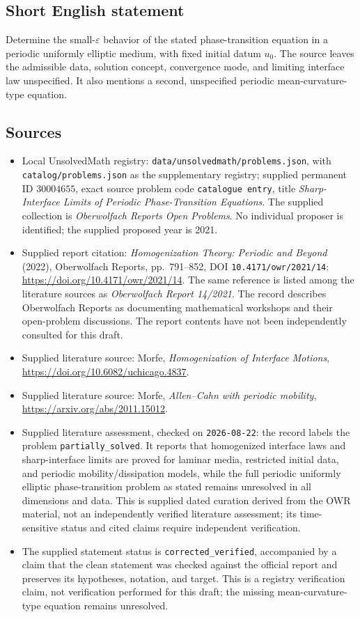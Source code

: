 \documentclass[11pt]{article}
\begin{document}
\subsection{Short English statement}
Determine the small-\(\varepsilon\) behavior of the stated phase-transition equation in a periodic uniformly elliptic medium, with fixed initial datum \(u_0\). The source leaves the admissible data, solution concept, convergence mode, and limiting interface law unspecified. It also mentions a second, unspecified periodic mean-curvature-type equation.
\subsection{Sources}
\begin{itemize}
\item Local UnsolvedMath registry: \texttt{data/unsolvedmath/problems.json}, with \texttt{catalog/problems.json} as the supplementary registry; supplied permanent ID \(30004655\), exact source problem code \texttt{catalogue entry}, title \emph{Sharp-Interface Limits of Periodic Phase-Transition Equations}. The supplied collection is \emph{Oberwolfach Reports Open Problems}. No individual proposer is identified; the supplied proposed year is 2021.
\item Supplied report citation: \emph{Homogenization Theory: Periodic and Beyond} (2022), Oberwolfach Reports, pp.~791--852, DOI \texttt{10.4171/owr/2021/14}: \url{https://doi.org/10.4171/owr/2021/14}. The same reference is listed among the literature sources as \emph{Oberwolfach Report 14/2021}. The record describes Oberwolfach Reports as documenting mathematical workshops and their open-problem discussions. The report contents have not been independently consulted for this draft.
\item Supplied literature source: Morfe, \emph{Homogenization of Interface Motions}, \url{https://doi.org/10.6082/uchicago.4837}.
\item Supplied literature source: Morfe, \emph{Allen--Cahn with periodic mobility}, \url{https://arxiv.org/abs/2011.15012}.
\item Supplied literature assessment, checked on \texttt{2026-08-22}: the record labels the problem \texttt{partially\_solved}. It reports that homogenized interface laws and sharp-interface limits are proved for laminar media, restricted initial data, and periodic mobility/dissipation models, while the full periodic uniformly elliptic phase-transition problem as stated remains unresolved in all dimensions and data. This is supplied dated curation derived from the OWR material, not an independently verified literature assessment; its time-sensitive status and cited claims require independent verification.
\item The supplied statement status is \texttt{corrected\_verified}, accompanied by a claim that the clean statement was checked against the official report and preserves its hypotheses, notation, and target. This is a registry verification claim, not verification performed for this draft; the missing mean-curvature-type equation remains unresolved.
\end{itemize}
\end{document}
